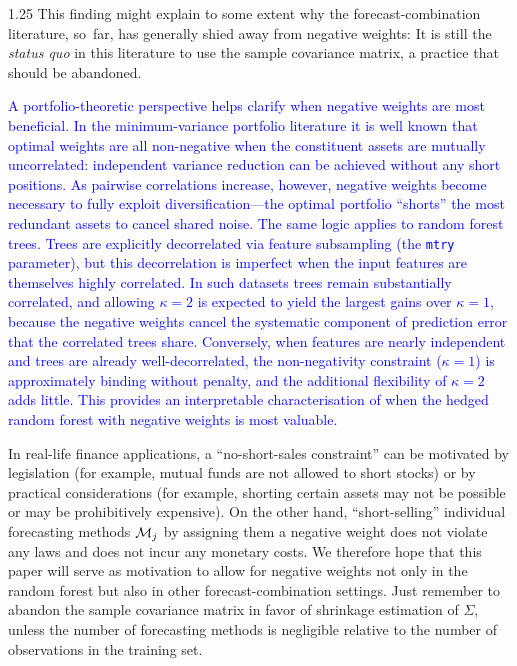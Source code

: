 \documentclass[12pt]{article}
\numberwithin{equation}{section}
\theoremstyle{plain}
\begin{document}
\begin{spacing}{1.25}
This finding might explain to some extent why the
forecast-combination literature, so~far, has generally shied
away from negative weights: It is still the {\em status quo} in
this literature to use the sample covariance
matrix, a practice that should be abandoned.

\textcolor{blue}{%
A portfolio-theoretic perspective helps clarify when negative weights are
most beneficial.
In the minimum-variance portfolio literature it is well known that optimal
weights are all non-negative when the constituent assets are mutually
uncorrelated: independent variance reduction can be achieved without any
short positions.
As pairwise correlations increase, however, negative weights become
necessary to fully exploit diversification---the optimal portfolio ``shorts''
the most redundant assets to cancel shared noise.
The same logic applies to random forest trees.
Trees are explicitly decorrelated via feature subsampling (the
\texttt{mtry} parameter), but this decorrelation is imperfect when the input
features are themselves highly correlated.
In such datasets trees remain substantially correlated, and allowing
$\kappa = 2$ is expected to yield the largest gains over $\kappa = 1$,
because the negative weights cancel the systematic component of prediction
error that the correlated trees share.
Conversely, when features are nearly independent and trees are already
well-decorrelated, the non-negativity constraint ($\kappa = 1$) is
approximately binding without penalty, and the additional flexibility of
$\kappa = 2$ adds little.
This provides an interpretable characterisation of when the hedged random
forest with negative weights is most valuable.
}

In real-life finance applications, a ``no-short-sales constraint'' can be
motivated by legislation (for example, mutual funds are not allowed to
short stocks) or by practical considerations (for example, shorting
certain assets may not be possible or may be prohibitively expensive). On the
other hand, ``short-selling'' individual forecasting methods ${\cal M}_j$ by
assigning them a negative weight does not violate any laws and
does not incur any monetary costs. We therefore hope that this paper will
serve as motivation to allow for negative
weights not only in the random forest but also 
in other forecast-combination settings. Just remember to abandon the
sample covariance matrix in favor of shrinkage estimation of $\Sigma$,
unless the number of forecasting methods is negligible relative to the number of observations in the training set.


\end{spacing}
\end{document}
